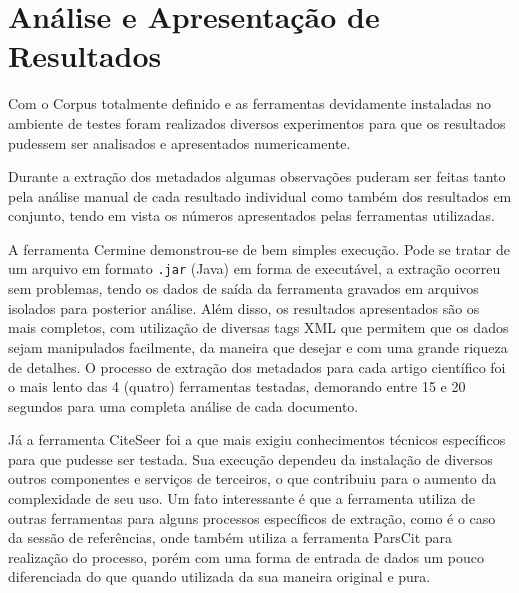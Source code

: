 
\chapter{Análise e Apresentação de Resultados}
\label{cha:results}



Com o Corpus totalmente definido e as ferramentas devidamente instaladas no ambiente de testes foram realizados diversos experimentos para que os resultados pudessem ser analisados e apresentados numericamente.


Durante a extração dos metadados algumas observações puderam ser feitas tanto pela análise manual de cada resultado individual como também dos resultados em conjunto, tendo em vista os números apresentados pelas ferramentas utilizadas.

A ferramenta Cermine demonstrou-se de bem simples execução. Pode se tratar de um arquivo em formato \texttt{.jar} (Java) em forma de executável, a extração ocorreu sem problemas, tendo os dados de saída da ferramenta gravados em arquivos isolados para posterior análise. Além disso, os resultados apresentados são os mais completos, com utilização de diversas tags XML que permitem que os dados sejam manipulados facilmente, da maneira que desejar e com uma grande riqueza de detalhes. O processo de extração dos metadados para cada artigo científico foi o mais lento das 4 (quatro) ferramentas testadas, demorando entre 15 e 20 segundos para uma completa análise de cada documento.

Já a ferramenta CiteSeer foi a que mais exigiu conhecimentos técnicos específicos para que pudesse ser testada. Sua execução dependeu da instalação de diversos outros componentes e serviços de terceiros, o que contribuiu para o aumento da complexidade de seu uso. Um fato interessante é que a ferramenta utiliza de outras ferramentas para alguns processos específicos de extração, como é o caso da sessão de referências, onde também utiliza a ferramenta ParsCit para realização do processo, porém com uma forma de entrada de dados um pouco diferenciada do que quando utilizada da sua maneira original e pura.

